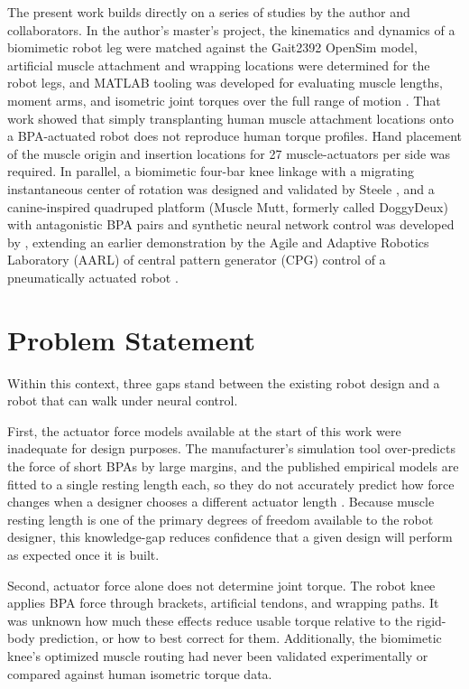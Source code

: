 The present work builds directly on a series of studies by the author and collaborators. In the author's master's project, the kinematics and dynamics of a biomimetic robot leg were matched against the Gait2392 OpenSim model, artificial muscle attachment and wrapping locations were determined for the robot legs, and MATLAB tooling was developed for evaluating muscle lengths, moment arms, and isometric joint torques over the full range of motion \citep{bolen_bipedal_2019, bolen_determination_2019}. That work showed that simply transplanting human muscle attachment locations onto a BPA-actuated robot does not reproduce human torque profiles. Hand placement of the muscle origin and insertion locations for 27 muscle-actuators per side was required. In parallel, a biomimetic four-bar knee linkage with a migrating instantaneous center of rotation was designed and validated by Steele \citep{steele_development_2017, steele_biomimetic_2018, steele_biomimetic_2018-1}, and a canine-inspired quadruped platform (Muscle Mutt, formerly  called DoggyDeux) with antagonistic BPA pairs and synthetic neural network control was developed by \citet{scharzenberger_design_2019}, extending an earlier demonstration by the Agile and Adaptive Robotics Laboratory (AARL) of central pattern generator (CPG) control of a pneumatically actuated robot \citep{hunt_development_2017}.


\section{Problem Statement}\label{sec:problem}

Within this context, three gaps stand between the existing robot design and a robot that can walk under neural control.

First, the actuator force models available at the start of this work were inadequate for design purposes. The manufacturer's simulation tool over-predicts the force of short BPAs by large margins, and the published empirical models are fitted to a single resting length each, so they do not accurately predict how force changes when a designer chooses a different actuator length \citep{sarosi_comparative_2017, martens_modeling_2017, hunt_modeling_2017}. Because muscle resting length is one of the primary degrees of freedom available to the robot designer, this knowledge-gap reduces confidence that a given design will perform as expected once it is built. 

Second, actuator force alone does not determine joint torque. The robot knee applies BPA force through brackets, artificial tendons, and wrapping paths. It was unknown how much these effects reduce usable torque relative to the rigid-body prediction, or how to best correct for them. Additionally, the biomimetic knee's optimized muscle routing \citep{morrow_optimization_2020} had never been validated experimentally or compared against human isometric torque data.

